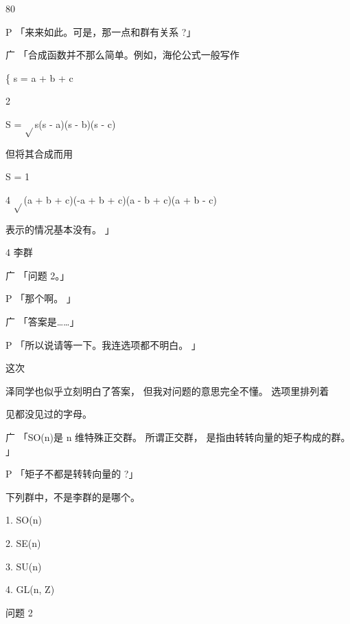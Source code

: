 80\par
P 「来来如此。可是，那一点和群有关系 ?」\par
广 「合成函数并不那么简单。例如，海伦公式一般写作\par
\{ s = a + b + c\par
2\par
S = $\sqrt{}$s(s - a)(s - b)(s - c)\par
但将其合成而用\par
S = 1\par
4 $\sqrt{}$(a + b + c)(-a + b + c)(a - b + c)(a + b - c)\par
表示的情况基本没有。 」\par
4 李群\par
广 「问题 2。」\par
P 「那个啊。 」\par
广 「答案是……」\par
P 「所以说请等一下。我连选项都不明白。 」\par
这次\par
泽同学也似乎立刻明白了答案， 但我对问题的意思完全不懂。 选项里排列着\par
见都没见过的字母。\par
广 「SO(n)是 n 维特殊正交群。 所谓正交群， 是指由转转向量的矩子构成的群。 」\par
P 「矩子不都是转转向量的 ?」\par
下列群中，不是李群的是哪个。\par
1. SO(n)\par
2. SE(n)\par
3. SU(n)\par
4. GL(n, Z)\par
问题 2\par

